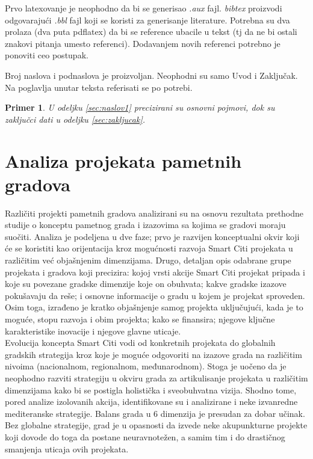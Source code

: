 \documentclass[a4paper,12pt]{article}
\newtheorem{primer}{Primer}[section]
\begin{document}
{Prvo latexovanje je neophodno da bi se generisao {\em .aux} fajl. {\em bibtex} proizvodi odgovarajući {\em .bbl} fajl koji se koristi za generisanje literature. 
Potrebna su dva prolaza (dva puta pdflatex) da bi se reference ubacile u tekst (tj da ne bi ostali znakovi pitanja umesto referenci). Dodavanjem novih referenci potrebno je ponoviti ceo postupak.  


Broj naslova i podnaslova je proizvoljan. Neophodni su samo Uvod i Zaključak. Na poglavlja unutar teksta referisati se po potrebi. 
\begin{primer}
U odeljku \ref{sec:naslov1} precizirani su osnovni pojmovi, dok su zaključci dati u odeljku \ref{sec:zakljucak}.
\end{primer}




\section{Analiza projekata pametnih gradova}
\label{slike_i_tabele}

Različiti projekti pametnih gradova analizirani su na osnovu rezultata prethodne studije o konceptu pametnog grada i izazovima sa kojima se gradovi moraju suočiti. Analiza je podeljena u dve faze; prvo je razvijen konceptualni okvir koji će se koristiti kao orijentacija kroz mogućnosti razvoja Smart Citi projekata u različitim već objašnjenim dimenzijama. Drugo, detaljan opis odabrane grupe projekata i gradova koji precizira: kojoj vrsti akcije Smart Citi projekat pripada i koje su povezane gradske dimenzije koje on obuhvata; kakve gradske izazove pokušavaju da reše; i osnovne informacije o gradu u kojem je projekat sproveden. Osim toga, izrađeno je kratko objašnjenje samog projekta uključujući, kada je to moguće, stopu razvoja i obim projekta; kako se finansira; njegove ključne karakteristike inovacije i njegove glavne uticaje. \\

Evolucija koncepta Smart Citi vodi od konkretnih projekata do globalnih gradskih strategija kroz koje je moguće odgovoriti na izazove grada na različitim nivoima (nacionalnom, regionalnom, međunarodnom). Stoga je uočeno da je neophodno razviti strategiju u okviru grada za artikulisanje projekata u različitim dimenzijama kako bi se postigla holistička i sveobuhvatna vizija. Shodno tome, pored analize izolovanih akcija, identifikovane su i analizirane i neke izvanredne mediteranske strategije. Balans grada u 6 dimenzija je presudan za dobar učinak. Bez globalne strategije, grad je u opasnosti da izvede neke akupunkturne projekte koji dovode do toga da postane neuravnotežen, a samim tim i do drastičnog smanjenja uticaja ovih projekata. \\

}
\end{document}
